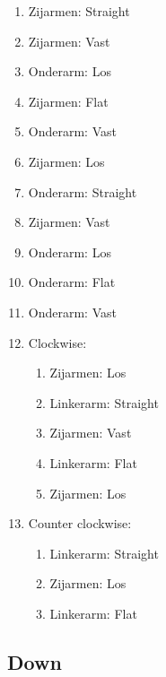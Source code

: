 \begin{enumerate}
	\item Zijarmen: Straight
	\item Zijarmen: Vast
	\item Onderarm: Los
	\item Zijarmen: Flat
	\item Onderarm: Vast
	\item Zijarmen: Los
	\item Onderarm: Straight
	\item Zijarmen: Vast
	\item Onderarm: Los
	\item Onderarm: Flat
	\item Onderarm: Vast
	\item Clockwise:
	\begin{enumerate}
		\item Zijarmen: Los
		\item Linkerarm: Straight
		\item Zijarmen: Vast
		\item Linkerarm: Flat
		\item Zijarmen: Los
	\end{enumerate}
	\item Counter clockwise:
	\begin{enumerate}
		\item Linkerarm: Straight
		\item Zijarmen: Los
		\item Linkerarm: Flat
	\end{enumerate}
\end{enumerate}
\newpage

\subsection{Down}

